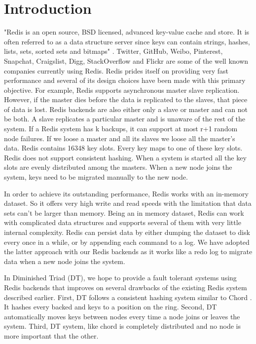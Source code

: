 \documentclass[10pt,twocolumn,letterpaper]{article}
\begin{document}
\section{Introduction}
"Redis is an open source, BSD licensed, advanced key-value cache and store. It is often referred to as a data structure server since keys can contain strings, hashes, lists, sets, sorted sets and bitmaps"\cite{http://redis.io/topics/introduction} . Twitter, GitHub, Weibo, Pinterest, Snapchat, Craigslist, Digg, StackOverflow and Flickr are some of the well known companies currently using Redis. Redis prides itself on providing very fast performance and several of its design choices have been made with this primary objective. For example, Redis supports asynchronous master slave replication. However, if the master dies before the data is replicated to the slaves, that piece of data is lost. Redis backends are also either only a slave or master and can not be both. A slave replicates a particular master and is unaware of the rest of the system. If a Redis system has k backups, it can support at most r+1 random node failures. If we loose a master and all its slaves we loose all the master's data. Redis contains 16348 key slots. Every key maps to one of these key slots. Redis does not support consistent hashing. When a system is started all the key slots are evenly distributed among the masters.  When a new node joins the system, keys need to be migrated manually to the new node.

In order to achieve its outstanding performance, Redis works with an in-memory dataset. So it offers very high write and read speeds with the limitation that data sets can't be larger than memory. Being an in memory dataset, Redis can work with complicated data structures and supports several of them with very little internal complexity. Redis can persist data by either dumping the dataset to disk every once in a while, or by appending each command to a log. We have adopted the latter approach with our Redis backends as it works like a redo log to migrate data when a new node joins the system. 

In Diminished Triad (DT), we hope to provide a fault tolerant systems using Redis backends that improves on several drawbacks of the existing Redis system described earlier. First,  DT follows a consistent hashing system similar to Chord \cite{Chord}. It hashes every backed and keys to a position on the ring. Second, DT automatically moves keys between nodes every time a node joins or leaves the system. Third, DT system, like chord is completely distributed and no node is more important that the other. 
\end{document}
